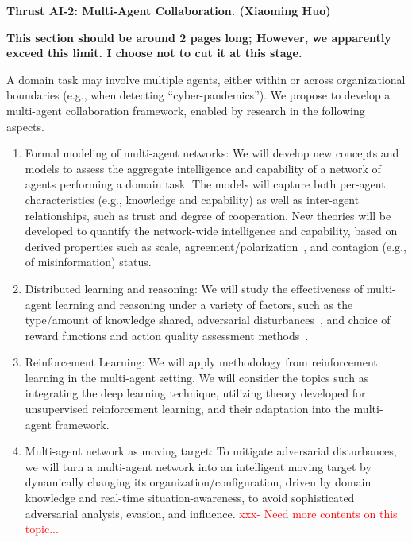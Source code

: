 \documentclass{NSF}
\begin{document}
\setcounter{section}{1}

\noindent \textbf{Thrust AI-2: Multi-Agent Collaboration. (Xiaoming Huo)}

\textbf{This section should be around 2 pages long; However, we apparently exceed this limit. I choose not to cut it at this stage.}


A domain task may involve multiple agents, either within or across organizational boundaries (e.g., when detecting ``cyber-pandemics”).
We propose to develop a multi-agent collaboration framework, enabled by research in the following aspects.
\begin{enumerate}
\item Formal modeling of multi-agent networks:
We will develop new concepts and models to assess the aggregate intelligence and capability of a network of agents performing a domain task.
The models will capture both per-agent characteristics (e.g., knowledge and capability) as well as inter-agent relationships, such as trust and degree of cooperation.
New theories will be developed to quantify the network-wide intelligence and capability, based on derived properties such as scale, agreement/polarization~\cite{wang22coevolution}, and contagion (e.g., of misinformation) status.

\item
Distributed learning and reasoning:
We will study the effectiveness of multi-agent learning and reasoning under a variety of factors, such as the type/amount of knowledge shared, adversarial disturbances~\cite{SilvestreRosaHespanhaSilvestreJun14}, and choice of reward functions and action quality assessment methods~\cite{radha_arel}.

\item Reinforcement Learning:
We will apply methodology from reinforcement learning in the multi-agent setting.
We will consider the topics such as integrating the deep learning technique, utilizing theory developed for unsupervised reinforcement learning, and their adaptation into the multi-agent framework.

\item
Multi-agent network as moving target:
To mitigate adversarial disturbances, we will turn a multi-agent network into an intelligent moving target by dynamically changing its organization/configuration, driven by domain knowledge and real-time situation-awareness, to avoid sophisticated adversarial analysis, evasion, and influence.
\textcolor{red}{xxx- Need more contents on this topic...}


\end{enumerate}
\end{document}
